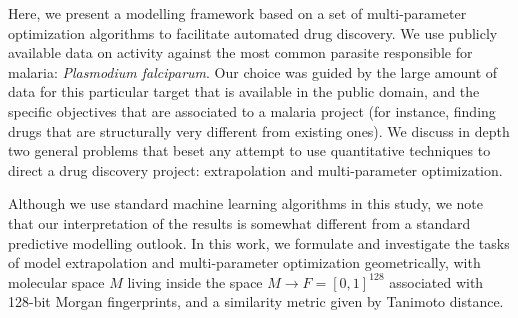 \documentclass{article}
\begin{document}
Here, we present a modelling framework based on a set of multi-parameter optimization algorithms to facilitate automated drug discovery.
We use publicly available data on activity against the most common parasite responsible for malaria: \textit{Plasmodium falciparum}. Our choice was guided by the large amount of data for this particular target that is available in the public domain, and the specific objectives that are associated to a malaria project (for instance, finding drugs that are structurally very different from existing ones).  We discuss in depth two general problems that beset any attempt to use quantitative techniques to direct a drug discovery project: extrapolation and multi-parameter optimization.
\newline
\newline


Although we use standard machine learning algorithms in this study, we note that our interpretation of the results is somewhat different from a standard predictive modelling outlook. 
In this work, we formulate and investigate  the tasks of model extrapolation and multi-parameter optimization geometrically, with molecular space $M$ living inside the space $M \to F = [0, 1]^{128}$ associated with 128-bit Morgan fingerprints, and a similarity metric given by Tanimoto distance. 
\end{document}
